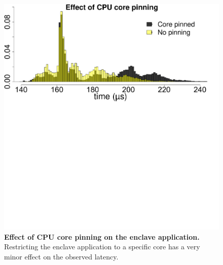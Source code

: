 \begin{figure}[t]
  \centering
    \includegraphics[trim={0 18cm 1.8cm 0}, clip, width=0.75\linewidth]{data/CPU_stress/plot_pin_1.pdf}
    \caption{\textbf{Effect of CPU core pinning on the enclave application.} Restricting the enclave application to a specific core has a very minor effect on the observed latency.}
    \figsaver
    \label{graph:cpuPin}
\end{figure}

